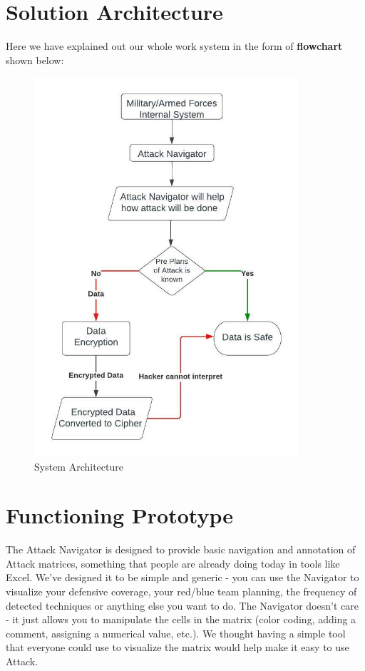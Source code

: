 \documentclass{article}
\begin{document}
\section{Solution Architecture}
Here we have explained out our whole work system in the form of \textbf{flowchart} shown below:

\maketitle
\begin{figure}[htp]
    \centering
    \includegraphics[width=9.80cm]{Flow Chart Attack Navigator.jpeg}
    \caption{System Architecture}
    \label{fig:galaxy}
\end{figure}



\section{Functioning Prototype}
The Attack Navigator is designed to provide basic navigation and annotation of Attack matrices, something that people are already doing today in tools like Excel. We've designed it to be simple and generic - you can use the Navigator to visualize your defensive coverage, your red/blue team planning, the frequency of detected techniques or anything else you want to do. The Navigator doesn't care - it just allows you to manipulate the cells in the matrix (color coding, adding a comment, assigning a numerical value, etc.). We thought having a simple tool that everyone could use to visualize the matrix would help make it easy to use Attack.
\end{document}
